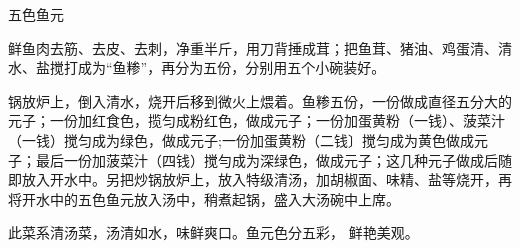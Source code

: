 \begin{recipe}[五福鱼元]{五色鱼元}

\ingredients


\cooking

\step 鲜鱼肉去筋、去皮、去刺，净重半斤，用刀背捶成茸；把鱼茸、猪油、鸡蛋清、清水、盐搅打成为“鱼糁”，再分为五份，分别用五个小碗装好。

\step 锅放炉上，倒入清水，烧开后移到微火上煨着。鱼糁五份，一份做成直径五分大的元子；一份加红食色，揽匀成粉红色，做成元子；一份加蛋黄粉（一钱）、菠菜汁（一钱）搅匀成为绿色，做成元子;一份加蛋黄粉（二钱〕搅匀成为黄色做成元子；最后一份加菠菜汁（四钱）搅勻成为深绿色，做成元子；这几种元子做成后随即放入开水中。另把炒锅放炉上，放入特级清汤，加胡椒面、味精、盐等烧开，再将开水中的五色鱼元放入汤中，稍煮起锅，盛入大汤碗中上席。

\notes

此菜系清汤菜，汤清如水，味鲜爽口。鱼元色分五彩， 鲜艳美观。

\end{recipe}

